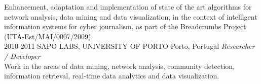 \documentclass{friggeri-cv}
\begin{document}
\begin{entrylist}
{Enhancement, adaptation and implementation of state of the art algorithms for network analysis, data mining and data visualization, in the context of intelligent information systems for cyber journalism, as part of the Breadcrumbs Project (UTA-Est/MAI/0007/2009).\\}
\entry
{2010-2011}
{SAPO LABS, UNIVERSITY OF PORTO}
{Porto, Portugal}
{\emph{Researcher / Developer}\\[-.5em]

Work in the areas of data mining, network analysis, community detection, information retrieval, real-time data analytics and data visualization.\\}

\end{entrylist}
\end{document}
